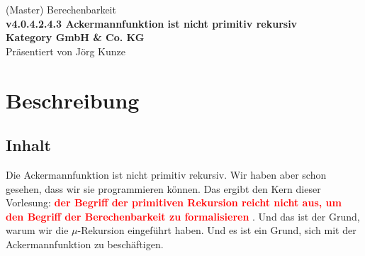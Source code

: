 \documentclass[a4paper]{amsart}
\theoremstyle{definition}
\newcommand{\imporant}[1]{ \textcolor{red}{\textbf{#1}} }
\begin{document}
\begin{titlepage}
\centering
{\huge
(Master) Berechenbarkeit\\[1cm]
\textbf{v4.0.4.2.4.3 Ackermannfunktion ist nicht primitiv rekursiv}
}\\[1cm]

\textbf{Kategory GmbH \& Co. KG}\\
Pr\"asentiert von Jörg Kunze

\end{titlepage}

%

\newpage

\section*{Beschreibung}

\subsection*{Inhalt}
Die Ackermannfunktion ist nicht primitiv rekursiv. Wir haben aber schon gesehen, dass wir sie programmieren
können. Das ergibt den Kern dieser Vorlesung: \imporant{der Begriff der primitiven Rekursion reicht 
nicht aus, um
den Begriff der Berechenbarkeit zu formalisieren}. Und das ist der Grund, warum wir die $\mu$-Rekursion
eingeführt haben. Und es ist ein Grund, sich mit der Ackermannfunktion zu beschäftigen.
\end{document}
